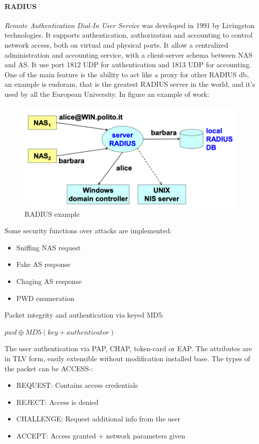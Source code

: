 \documentclass[12pt]{article}
\begin{document}
\paragraph{RADIUS} \textit{Remote Authentication Dial-In User Service} was developed in 1991 by Livingston technologies. It supports authentication, authorization and accounting to control network access, both on virtual and physical ports. It allow a centralized administration and accounting service, with a client-server schema between NAS and AS. It use port 1812 UDP for authentication and 1813 UDP for accounting.\\
One of the main feature is the ability to act like a proxy for other RADIUS db, an example is eudoram, that is the greatest RADIUS server in the world, and it's used by all the European University. In figure an example of work:
\begin{figure}[H]
   \centering
   \includegraphics[width=\linewidth]{images/radius.png}
   \caption{RADIUS example}
   \label{fig:radius}
\end{figure}
Some security functions over attacks are implemented:
\begin{itemize}
  \item Sniffing NAS request
  \item Fake AS response
  \item Chaging AS response
  \item PWD enumeration
\end{itemize}
Packet integrity and authentication via keyed MD5:
\begin{center}
  $pwd \oplus MD5(key+authenticator)$
\end{center}
The user authentication via PAP, CHAP, token-card or EAP. The attributes are in TLV form, easily extensible without modification installed base. The types of the packet can be ACCESS-:
\begin{itemize}
  \item REQUEST: Contains access credentials
  \item REJECT: Access is denied
  \item CHALLENGE: Request additional info from the user
  \item ACCEPT: Access granted + network parameters given
\end{itemize}
\end{document}
